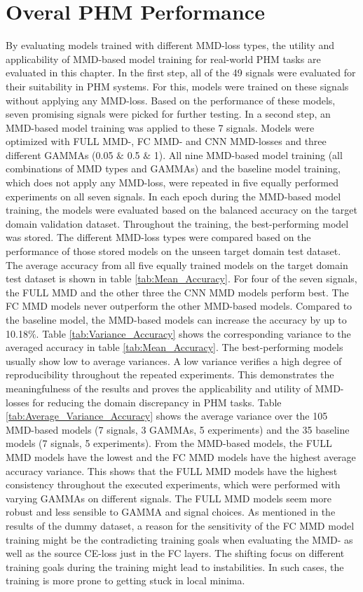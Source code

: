 \section{Overal PHM Performance}\label{ch:PHM_performance}
By evaluating models trained with different MMD-loss types, the utility and applicability of MMD-based model training for real-world PHM tasks are evaluated in this chapter. In the first step, all of the 49 signals were evaluated for their suitability in PHM systems. For this, models were trained on these signals without applying any MMD-loss. Based on the performance of these models, seven promising signals were picked for further testing. In a second step, an MMD-based model training was applied to these 7 signals. Models were optimized with FULL MMD-, FC MMD- and CNN MMD-losses and three different GAMMAs (0.05 $\&$ 0.5 $\&$ 1). All nine MMD-based model training (all combinations of MMD types and GAMMAs) and the baseline model training, which does not apply any MMD-loss, were repeated in five equally performed experiments on all seven signals. In each epoch during the MMD-based model training, the models were evaluated based on the balanced accuracy on the target domain validation dataset. Throughout the training, the best-performing model was stored. The different MMD-loss types were compared based on the performance of those stored models on the unseen target domain test dataset. The average accuracy from all five equally trained models on the target domain test dataset is shown in table \ref{tab:Mean_Accuracy}. For four of the seven signals, the FULL MMD and the other three the CNN MMD models perform best. The FC MMD models never outperform the other MMD-based models. Compared to the baseline model, the MMD-based models can increase the accuracy by up to 10.18$\%$. Table \ref{tab:Variance_Accuracy} shows the corresponding variance to the averaged accuracy in table \ref{tab:Mean_Accuracy}. The best-performing models usually show low to average variances. A low variance verifies a high degree of reproducibility throughout the repeated experiments. This demonstrates the meaningfulness of the results and proves the applicability and utility of MMD-losses for reducing the domain discrepancy in PHM tasks. Table \ref{tab:Average_Variance_Accuracy} shows the average variance over the 105 MMD-based models (7 signals, 3 GAMMAs, 5 experiments) and the 35 baseline models (7 signals, 5 experiments). From the MMD-based models, the FULL MMD models have the lowest and the FC MMD models have the highest average accuracy variance. This shows that the FULL MMD models have the highest consistency throughout the executed experiments, which were performed with varying GAMMAs on different signals. The FULL MMD models seem more robust and less sensible to GAMMA and signal choices. As mentioned in the results of the dummy dataset, a reason for the sensitivity of the FC MMD model training might be the contradicting training goals when evaluating the MMD- as well as the source CE-loss just in the FC layers. The shifting focus on different training goals during the training might lead to instabilities. In such cases, the training is more prone to getting stuck in local minima.
